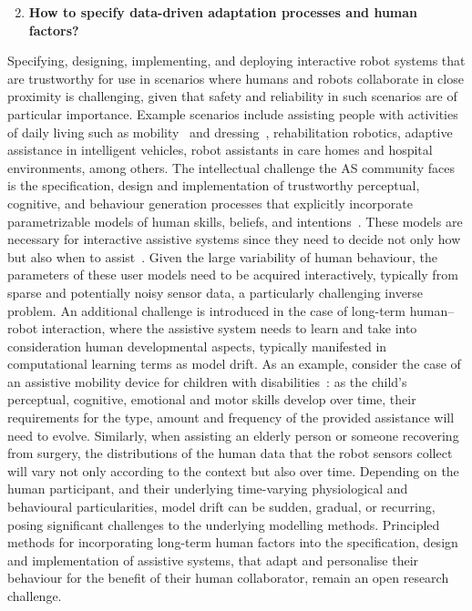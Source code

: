 \documentclass[sigconf,nonacm]{acmart}%
\begin{document}
	\begin{enumerate}[leftmargin=0.5cm]
		\setcounter{enumi}{1}
		\item \textbf{How to specify data-driven adaptation processes and human factors?}
	\end{enumerate}
	Specifying, designing, implementing, and deploying interactive robot systems that are trustworthy for use in scenarios where humans and robots collaborate in close proximity is challenging, given that safety and reliability in such scenarios are of particular importance. Example scenarios include assisting people with activities of daily living such as mobility~\cite{SohDemiris2015} and dressing~\cite{GaoEtAl2020}, rehabilitation robotics, adaptive assistance in intelligent vehicles, robot assistants in care homes and hospital environments, among others. The intellectual challenge the AS community faces is the specification, design and implementation of trustworthy perceptual, cognitive, and behaviour generation processes that explicitly incorporate parametrizable models of human skills, beliefs, and intentions~\cite{Demiris2007}. 
	These models are necessary for interactive assistive systems since they need to decide not only how but also when to assist~\cite{GeorgiouDemiris}. Given the large variability of human behaviour, the parameters of these user models need to be acquired interactively, typically from sparse and potentially noisy sensor data, a particularly challenging inverse problem. An additional challenge is introduced in the case of long-term human–robot interaction, where the assistive system needs to learn and take into consideration human developmental aspects, typically manifested in computational learning terms as model drift. 
	As an example, consider the case of an assistive mobility device for children with disabilities~\cite{SohDemiris2015}: as the child's perceptual, cognitive, emotional and motor skills develop over time, their requirements for the type, amount and frequency of the provided assistance will need to evolve. Similarly, when assisting an elderly person or someone recovering from surgery, the distributions of the human data that the robot sensors collect will vary not only according to the context but also over time. 
	Depending on the human participant, and their underlying time-varying physiological and behavioural particularities, model drift can be sudden, gradual, or recurring, posing significant challenges to the underlying modelling methods. Principled methods for incorporating long-term human factors into the specification, design and implementation of assistive systems, that adapt and personalise their behaviour for the benefit of their human collaborator, remain an open research challenge. 
	
\end{document}
